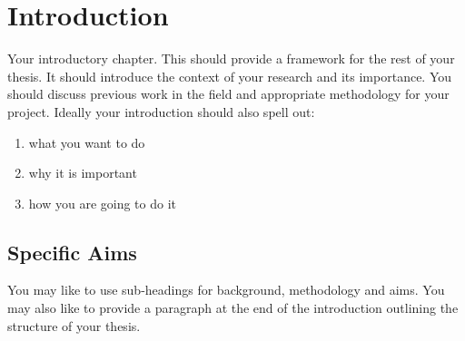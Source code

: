 \chapter{Introduction}
Your introductory chapter. This should provide a framework for the rest of 
your thesis. It should introduce the context of your research and its 
importance. You should discuss previous work in the field and appropriate 
methodology for your project. Ideally your introduction should also spell out:
\begin{enumerate}
\item what you want to do
\item why it is important
\item how you are going to do it
\end{enumerate}

\section{Specific Aims}
You may like to use sub-headings for background, methodology and aims. You may 
also like to provide a paragraph at the end of the introduction outlining the 
structure of your thesis.

 \newpage

